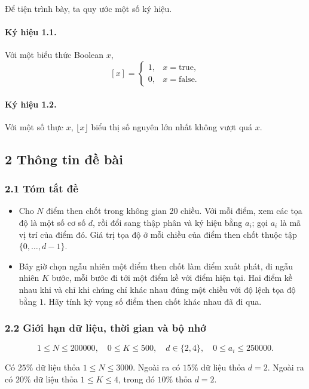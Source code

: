 \documentclass[11pt]{article}
\begin{document}
Để tiện trình bày, ta quy ước một số ký hiệu.

\paragraph{Ký hiệu 1.1.}
Với một biểu thức Boolean \(x\),
\[
  [x]=
  \begin{cases}
    1, & x=\text{true},\\
    0, & x=\text{false}.
  \end{cases}
\]

\paragraph{Ký hiệu 1.2.}
Với một số thực \(x\), \(\lfloor x\rfloor\) biểu thị số nguyên lớn nhất không
vượt quá \(x\).

\subsection*{2 Thông tin đề bài}

\subsubsection*{2.1 Tóm tắt đề}

\begin{itemize}
  \item Cho \(N\) điểm then chốt trong không gian 20 chiều. Với mỗi điểm, xem
  các tọa độ là một số cơ số \(d\), rồi đổi sang thập phân và ký hiệu bằng
  \(a_i\); gọi \(a_i\) là mã vị trí của điểm đó. Giá trị tọa độ ở mỗi chiều của
  điểm then chốt thuộc tập \(\{0,\ldots,d-1\}\).
  \item Bây giờ chọn ngẫu nhiên một điểm then chốt làm điểm xuất phát, đi ngẫu
  nhiên \(K\) bước, mỗi bước đi tới một điểm kề với điểm hiện tại. Hai điểm kề
  nhau khi và chỉ khi chúng chỉ khác nhau đúng một chiều với độ lệch tọa độ bằng
  \(1\). Hãy tính kỳ vọng số điểm then chốt khác nhau đã đi qua.
\end{itemize}

\subsubsection*{2.2 Giới hạn dữ liệu, thời gian và bộ nhớ}

\[
  1\le N\le 200000,\quad 0\le K\le 500,\quad d\in\{2,4\},\quad
  0\le a_i\le 250000.
\]

Có \(25\%\) dữ liệu thỏa \(1\le N\le 3000\). Ngoài ra có \(15\%\) dữ liệu thỏa
\(d=2\). Ngoài ra có \(20\%\) dữ liệu thỏa \(1\le K\le 4\), trong đó \(10\%\)
thỏa \(d=2\).
\end{document}
